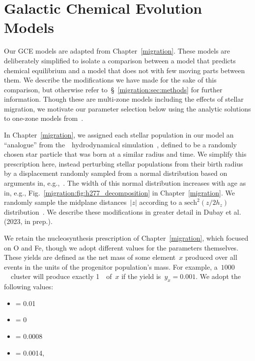 
\section{Galactic Chemical Evolution Models}
\label{outflows:sec:gce}

Our GCE models are adapted from Chapter~\ref{migration}.
These models are deliberately simplified to isolate a comparison between a
model that predicts chemical equilibrium and a model that does not with few
moving parts between them.
We describe the modifications we have made for the sake of this comparison, but
otherwise refer to~\S~\ref{migration:sec:methods} for further information.
Though these are multi-zone models including the effects of stellar migration,
we motivate our parameter selection below using the analytic solutions to
one-zone models from~\citet{Weinberg2017b}.
\par
In Chapter~\ref{migration}, we assigned each stellar population in our model an
``analogue'' from the~\hsim~hydrodynamical simulation~\citep{Christensen2012,
Loebman2012, Loebman2014, Zolotov2012, Brooks2014}, defined to be a randomly
chosen star particle that was born at a similar radius and time.
We simplify this prescription here, instead perturbing stellar populations from
their birth radius by a displacement randomly sampled from a normal
distribution based on arguments in, e.g.,~\citet{Frankel2018}.
The width of this normal distribution increases with age as in, e.g.,
Fig.~\ref{migration:fig:h277_decomposition} in Chapter~\ref{migration}.
We randomly sample the midplane distances~$\left|z\right|$ according to a
$\text{sech}^2(z / 2h_z)$ distribution~\citep{Binney1987}.
We describe these modifications in greater detail in Dubay et al. (2023, in
prep.).
\par
We retain the nucleosynthesis prescription of Chapter~\ref{migration}, which
focused on O and Fe, though we adopt different values for the parameters
themselves.
These yields are defined as the net mass of some element~$x$ produced over all
events in the units of the progenitor population's mass.
For example, a~$1000$~\msun~cluster will produce exactly 1~\msun~of~$x$ if
the yield is~$y_x = 0.001$.
We adopt the following values:
\begin{itemize}

	\item {} = 0.01

	\item {} = 0

	\item {} = 0.0008

	\item {} = 0.0014,

\end{itemize}
